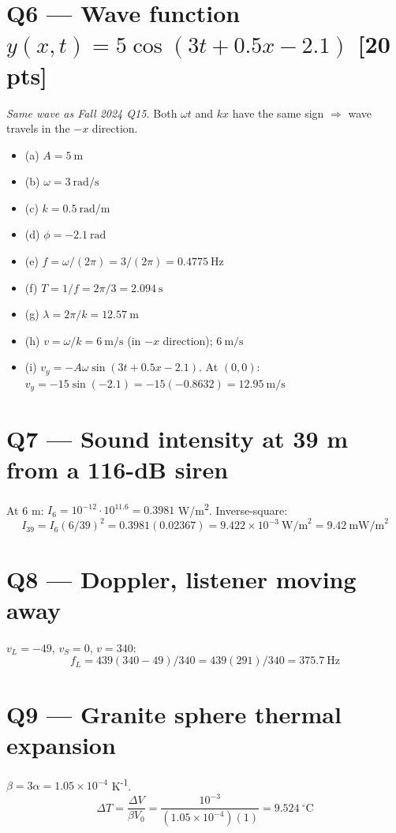 \documentclass[11pt]{article}
\begin{document}
\section*{Q6 --- Wave function $y(x,t)=5\cos(3t+0.5x-2.1)$ [20 pts]}
\emph{Same wave as Fall 2024 Q15.} Both $\omega t$ and $kx$ have the same sign $\Rightarrow$ wave travels in the $-x$ direction.
\begin{itemize}[leftmargin=*]
  \item (a) $A = \boxed{5\ \text{m}}$
  \item (b) $\omega = \boxed{3\ \text{rad/s}}$
  \item (c) $k = \boxed{0.5\ \text{rad/m}}$
  \item (d) $\phi = \boxed{-2.1\ \text{rad}}$
  \item (e) $f = \omega/(2\pi) = 3/(2\pi) = \boxed{0.4775\ \text{Hz}}$
  \item (f) $T = 1/f = 2\pi/3 = \boxed{2.094\ \text{s}}$
  \item (g) $\lambda = 2\pi/k = \boxed{12.57\ \text{m}}$
  \item (h) $v = \omega/k = 6\ \text{m/s}$ (in $-x$ direction); $\boxed{6\ \text{m/s}}$
  \item (i) $v_y = -A\omega\sin(3t+0.5x-2.1)$. At $(0,0)$: $v_y=-15\sin(-2.1)=-15(-0.8632)=\boxed{12.95\ \text{m/s}}$
\end{itemize}

\section*{Q7 --- Sound intensity at 39 m from a 116-dB siren}
At 6 m: $I_6 = 10^{-12}\cdot 10^{11.6} = 0.3981$ W/m\textsuperscript{2}. Inverse-square:
\[ I_{39} = I_6(6/39)^2 = 0.3981(0.02367) = 9.422\times 10^{-3}\ \text{W/m}^2 = \boxed{9.42\ \text{mW/m}^2} \]

\section*{Q8 --- Doppler, listener moving away}
$v_L=-49$, $v_S=0$, $v=340$:
\[ f_L = 439(340-49)/340 = 439(291)/340 = \boxed{375.7\ \text{Hz}} \]

\section*{Q9 --- Granite sphere thermal expansion}
$\beta = 3\alpha = 1.05\times 10^{-4}$ K\textsuperscript{-1}.
\[ \Delta T = \frac{\Delta V}{\beta V_0} = \frac{10^{-3}}{(1.05\times 10^{-4})(1)} = \boxed{9.524\ ^\circ\text{C}} \]
\end{document}
